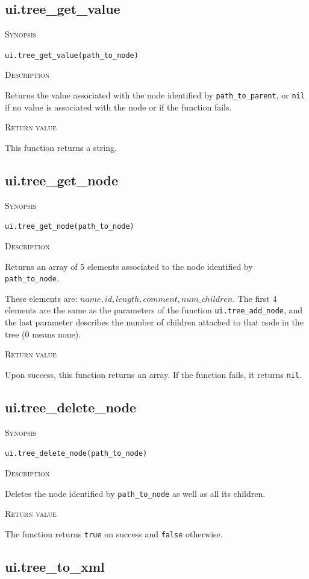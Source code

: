 \documentclass[11pt]{report}
\newcommand{\mansection}[1]{\vspace{0.5em}\par\noindent\textsc{#1}\vspace{0.5em}\par}
\begin{document}
\subsection{ui.tree\_get\_value}

\mansection{Synopsis}
\texttt{ui.tree\_get\_value(path\_to\_node)}

\mansection{Description}
  Returns the value associated with the node identified by \texttt{path\_to\_parent}, 
  or \texttt{nil} if no value is associated with the node or if the function fails.

\mansection{Return value}
  This function returns a string.
 

\subsection{ui.tree\_get\_node}

\mansection{Synopsis}
\texttt{ui.tree\_get\_node(path\_to\_node)}

\mansection{Description}
  Returns an array of 5 elements associated to the node identified by 
  \texttt{path\_to\_node}.
 
  These elements are: ${name, id, length, comment, num\_children}$. 
  The first 4 elements are the same as the parameters of the function 
  \texttt{ui.tree\_add\_node}, and the last parameter describes the number of 
  children attached to that node in the tree (0 means none).

\mansection{Return value}
  Upon success, this function returns an array.
  If the function fails, it returns \texttt{nil}.

\subsection{ui.tree\_delete\_node}

\mansection{Synopsis}
\texttt{ui.tree\_delete\_node(path\_to\_node)}

\mansection{Description}
  Deletes the node identified by \texttt{path\_to\_node} as well as all its 
  children.

\mansection{Return value}
  The function returns \texttt{true} on success and \texttt{false} otherwise.


\subsection{ui.tree\_to\_xml}
\end{document}
